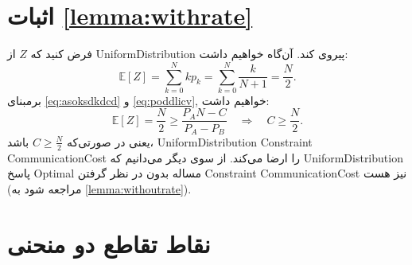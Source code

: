 \section{اثبات \autoref{lemma:withrate}}
\label{sec:withrate}
فرض کنید که $Z$ از 
\gls{UniformDistribution}
پیروی کند. آن‌گاه خواهیم داشت:
\begin{equation}
\mathbb{E}[Z] = \sum_{k=0}^{N}kp_k = \sum_{k=0}^{N}\frac{k}{N+1} = \frac{N}{2}.
\label{eq:poddlicv}
\end{equation}
برمبنای 
\eqref{eq:asoksdkdcd} و \eqref{eq:poddlicv}, 
خواهیم داشت:
\begin{equation}
 \mathbb{E}[Z]=\frac{N}{2}\geq \frac{P_AN-C}{P_A-P_B} \quad \Longrightarrow \quad 
C\geq \frac{N}{2}.
\end{equation}
یعنی  در صورتی‌که
$C\geq \frac{N}{2}$
باشد،
\gls{UniformDistribution} \gls{Constraint} \gls{CommunicationCost}
را ارضا می‌کند. از سوی دیگر می‌دانیم که 
\gls{UniformDistribution} پاسخ \gls{Optimal}
مساله بدون در نظر گرفتن
\gls{Constraint} \gls{CommunicationCost}
نیز هست (مراجعه شود به
\autoref{lemma:withoutrate}).



\section{نقاط تقاطع دو منحنی}
\label{spapdpsadf}

